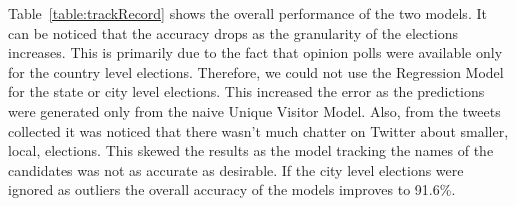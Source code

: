 Table~\ref{table:trackRecord} shows the overall performance of the two models. 
It can be noticed that the accuracy drops as the granularity of the elections increases. 
This is primarily due to the fact that opinion polls were available only for the country level elections.
Therefore, we could not use the Regression Model for the state or city level elections.
This increased the error as the predictions were generated only from the naive Unique Visitor Model.
Also, from the tweets collected it was noticed that there wasn't much chatter on Twitter about 
smaller, local, elections.
This skewed the results as the model tracking the names of the candidates was not as accurate as desirable.
If the city level elections were ignored as outliers the overall accuracy of the models improves to 91.6\%.
\fi
